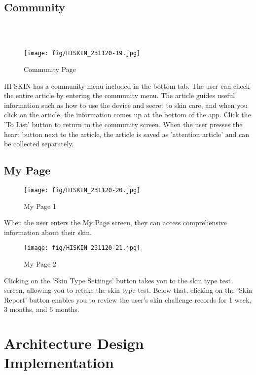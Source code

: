 \documentclass[conference]{IEEEtran}
\begin{document}
\subsection{Community} \\ \\
    \begin{figure}[h]
    \centering
    \texttt{[image: fig/HISKIN\_231120-19.jpg]}
    \label{fig:Community Page}
    \caption{Community Page} 
    \end{figure}
HI-SKIN has a community menu included in the bottom tab. The user can check the entire article by entering the community menu. The article guides useful information such as how to use the device and secret to skin care, and when you click on the article, the information comes up at the bottom of the app. Click the 'To List' button to return to the community screen. When the user presses the heart button next to the article, the article is saved as 'attention article' and can be collected separately. 


\subsection{My Page}
    \begin{figure}[h]
    \centering
    \texttt{[image: fig/HISKIN\_231120-20.jpg]}
    \label{fig:My Page 1}
    \caption{My Page 1} 
    \end{figure}
When the user enters the My Page screen, they can access comprehensive information about their skin. \\

\begin{figure}[h]
    \centering
    \texttt{[image: fig/HISKIN\_231120-21.jpg]}
    \label{fig:My Page 2}
    \caption{My Page 2} 
    \end{figure}
    Clicking on the 'Skin Type Settings' button takes you to the skin type test screen, allowing you to retake the skin type test. Below that, clicking on the 'Skin Report' button enables you to review the user's skin challenge records for 1 week, 3 months, and 6 months.
\\

\section{Architecture Design Implementation}
\end{document}
